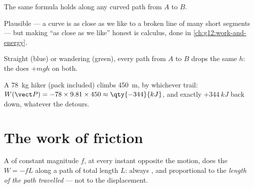 \begin{proposition}\label{prop:g11:work-of-force:anypath}
The same formula holds along any curved path from $A$ to $B$.
\end{proposition}
\admitted

\begin{remark}\label{rem:g11:work-of-force:anypath}
Plausible --- a curve is as close as we like to a broken line of many
short segments --- but making ``as close as we like'' honest is
calculus, done in \cref{ch:g12:work-and-energy}.
\end{remark}

\begin{omfigure}

{\small Straight (blue) or wandering (green), every path from $A$
to $B$ drops the same $h$: the  does $+mgh$ on both.}
\end{omfigure}

\begin{example}[Hiker]\label{ex:g11:work-of-force:hiker}
A \qty{78}{kg} hiker (pack included) climbs \qty{450}{m}, by whichever
trail: $W(\vect P) = -78 \times 9.81 \times 450 \approx \qty{-344}{kJ}$,
and exactly $+\qty{344}{kJ}$ back down, whatever the detours.
\end{example}

\section{The work of friction}

\begin{proposition}\label{prop:g11:work-of-force:friction}
A   of constant magnitude $f$, at every instant opposite
the motion, does the  $W = -fL$ along a path of total length $L$:
always , and proportional to the \emph{length of the path
travelled} --- not to the displacement.
\end{proposition}

